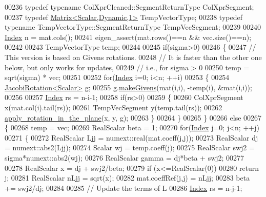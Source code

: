 \begin{DoxyCode}
00236   \textcolor{keyword}{typedef} \textcolor{keyword}{typename} ColXprCleaned::SegmentReturnType ColXprSegment;
00237   \textcolor{keyword}{typedef} \hyperlink{group___core___module}{Matrix<Scalar,Dynamic,1>} TempVectorType;
00238   \textcolor{keyword}{typedef} \textcolor{keyword}{typename} TempVectorType::SegmentReturnType TempVecSegment;
00239 
00240   \hyperlink{group___cholesky___module_ac7a64274814fa76e8b1e9e945546037f}{Index} n = mat.cols();
00241   eigen\_assert(mat.rows()==n && vec.size()==n);
00242 
00243   TempVectorType temp;
00244 
00245   \textcolor{keywordflow}{if}(sigma>0)
00246   \{
00247     \textcolor{comment}{// This version is based on Givens rotations.}
00248     \textcolor{comment}{// It is faster than the other one below, but only works for updates,}
00249     \textcolor{comment}{// i.e., for sigma > 0}
00250     temp = sqrt(sigma) * vec;
00251 
00252     \textcolor{keywordflow}{for}(\hyperlink{group___cholesky___module_ac7a64274814fa76e8b1e9e945546037f}{Index} i=0; i<n; ++i)
00253     \{
00254       \hyperlink{group___jacobi___module_class_eigen_1_1_jacobi_rotation}{JacobiRotation<Scalar>} g;
00255       g.\hyperlink{group___jacobi___module_af73c81e9cc139b7e0d877ce553b02ec0}{makeGivens}(mat(i,i), -temp(i), &mat(i,i));
00256 
00257       \hyperlink{group___cholesky___module_ac7a64274814fa76e8b1e9e945546037f}{Index} rs = n-i-1;
00258       \textcolor{keywordflow}{if}(rs>0)
00259       \{
00260         ColXprSegment x(mat.col(i).tail(rs));
00261         TempVecSegment y(temp.tail(rs));
00262         \hyperlink{namespace_eigen_1_1internal_a5f7738a5c56c9b9decf94d9728ba7906}{apply\_rotation\_in\_the\_plane}(x, y, g);
00263       \}
00264     \}
00265   \}
00266   \textcolor{keywordflow}{else}
00267   \{
00268     temp = vec;
00269     RealScalar beta = 1;
00270     \textcolor{keywordflow}{for}(\hyperlink{group___cholesky___module_ac7a64274814fa76e8b1e9e945546037f}{Index} j=0; j<n; ++j)
00271     \{
00272       RealScalar Ljj = numext::real(mat.coeff(j,j));
00273       RealScalar dj = numext::abs2(Ljj);
00274       Scalar wj = temp.coeff(j);
00275       RealScalar swj2 = sigma*numext::abs2(wj);
00276       RealScalar gamma = dj*beta + swj2;
00277 
00278       RealScalar x = dj + swj2/beta;
00279       \textcolor{keywordflow}{if} (x<=RealScalar(0))
00280         \textcolor{keywordflow}{return} j;
00281       RealScalar nLjj = sqrt(x);
00282       mat.coeffRef(j,j) = nLjj;
00283       beta += swj2/dj;
00284 
00285       \textcolor{comment}{// Update the terms of L}
00286       \hyperlink{group___cholesky___module_ac7a64274814fa76e8b1e9e945546037f}{Index} rs = n-j-1;

\end{DoxyCode}
